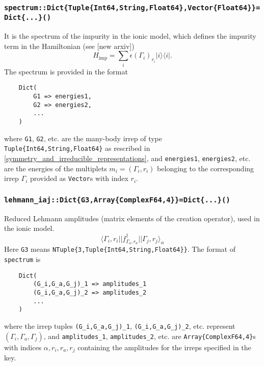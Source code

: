 \documentclass[notitlepage]{article}
\newcommand{\ket}[1]{|#1\rangle}
\newcommand{\bra}[1]{\langle #1 |}
\begin{document}
\subsubsection{\texttt{spectrum::Dict\{Tuple\{Int64,String,Float64\},Vector\{Float64\}\}=Dict\{...\}()}}
\label{nrg_spectrum}
It is the spectrum of the impurity in the ionic model, which
defines the impurity term in the Hamiltonian (see [new
arxiv])
\begin{equation}
    H_\text{imp}
    =
    \sum_i
    \epsilon(\Gamma_i)_{r_i}
    \ket{i}\bra{i}.
\end{equation}
The spectrum is provided in the format
\begin{verbatim}
    Dict(
        G1 => energies1,
        G2 => energies2,
        ...
    )
\end{verbatim}
where \texttt{G1}, \texttt{G2}, etc. are the many-body irrep 
of type \texttt{Tuple\{Int64,String,Float64\}} as rescribed
in \ref{symmetry_and_irreducible_representations}, and
\texttt{energies1}, \texttt{energies2}, etc. are the
energies of the multiplets $m_i=(\Gamma_i,r_i)$ belonging to
the corresponding irrep $\Gamma_i$ provided as
\texttt{Vector}s with index $r_i$.

\subsubsection{\texttt{lehmann\_iaj::Dict\{G3,Array\{ComplexF64,4\}\}=Dict\{...\}()}}
\label{nrg_lehmanniaj}
Reduced Lehmann amplitudes (matrix elements of the creation
operator), used in the ionic model.
\begin{equation}
    \bra{\Gamma_i,r_i}| 
    f^\dagger_{\Gamma_a,r_a}
    |\ket{\Gamma_j,r_j}_\alpha
\end{equation}
Here \texttt{G3} means
\texttt{NTuple\{3,Tuple\{Int64,String,Float64\}\}}. The
format of \texttt{spectrum} is
\begin{verbatim}
    Dict(
        (G_i,G_a,G_j)_1 => amplitudes_1
        (G_i,G_a,G_j)_2 => amplitudes_2
        ...
    )
\end{verbatim}
where the irrep tuples \texttt{(G\_i,G\_a,G\_j)\_1},
\texttt{(G\_i,G\_a,G\_j)\_2}, etc. represent
$(\Gamma_i,\Gamma_a,\Gamma_j)$, and \texttt{amplitudes\_1},
\texttt{amplitudes\_2}, etc. are
\texttt{Array\{ComplexF64,4\}}s with indices
$\alpha,r_i,r_a,r_j$ containing the amplitudes for the
irreps specified in the key.
\end{document}
